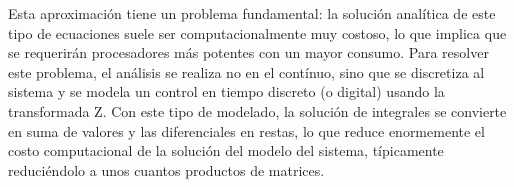 Esta aproximación tiene un problema fundamental: la solución analítica de este tipo de ecuaciones suele ser computacionalmente muy costoso, lo que implica que se requerirán procesadores más potentes con un mayor consumo.
Para resolver este problema, el análisis se realiza no en el contínuo, sino que se discretiza al sistema y se modela un control en tiempo discreto (o digital) usando la transformada Z.
Con este tipo de modelado, la solución de integrales se convierte en suma de valores y las diferenciales en restas, lo que reduce enormemente el costo computacional de la solución del modelo del sistema, típicamente reduciéndolo a unos cuantos productos de matrices.








